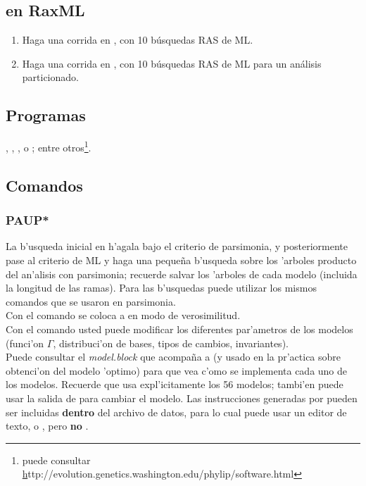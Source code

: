 \subsection{en RaxML}
\noindent
\begin{enumerate}
\item Haga una corrida en , con 10 b\'usquedas RAS de ML.
\item Haga una corrida en , con 10 b\'usquedas RAS de ML para un an\'alisis particionado.
\end{enumerate}



\subsection{Programas}
\noindent
{}, , ,  o ; entre otros\footnote{puede consultar 
\href{}http://evolution.genetics.washington.edu/phylip/software.html}.
\subsection{Comandos}
\subsubsection{PAUP*}
La b'usqueda inicial en  h'agala bajo el criterio de parsimonia, y posteriormente pase al criterio de ML y haga una \textrm{peque\~na} b'usqueda sobre los 'arboles producto del an'alisis con parsimonia; recuerde salvar los 'arboles de cada modelo (incluida la longitud de las ramas). Para las b'usquedas puede utilizar los mismos comandos que se usaron en parsimonia.\\
Con el comando  se coloca a  en modo de verosimilitud.\\
Con el comando  usted puede modificar los diferentes par'ametros de los modelos (funci'on $\Gamma$, distribuci'on de bases, tipos de cambios, invariantes).\\ 
Puede consultar el \textit{model.block} que acompa\~na a  (y usado en la pr'actica sobre obtenci'on del modelo 'optimo) para que vea c'omo se implementa cada uno de los modelos. Recuerde que  usa expl'icitamente los 56 modelos; tambi'en puede usar la salida de  para cambiar el modelo. Las instrucciones generadas por  pueden ser incluidas \textbf{dentro} del archivo de datos, para lo cual puede usar un editor de texto,  o , pero \textbf{no} .\\

